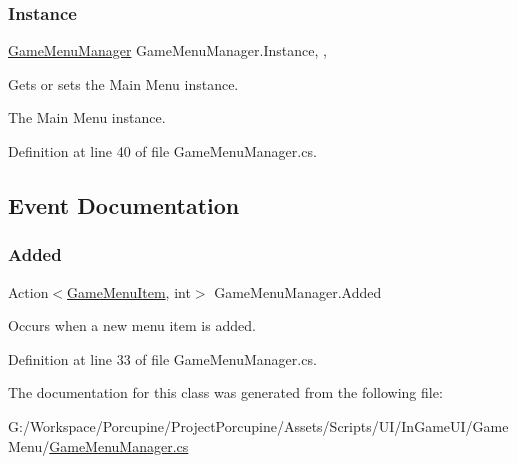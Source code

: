 \subsubsection{\texorpdfstring{Instance}{Instance}}
{\footnotesize\ttfamily \hyperlink{class_game_menu_manager}{Game\+Menu\+Manager} Game\+Menu\+Manager.\+Instance\hspace{0.3cm}{\ttfamily [static]}, {\ttfamily [get]}, {\ttfamily [set]}}



Gets or sets the Main Menu instance. 

The Main Menu instance.

Definition at line 40 of file Game\+Menu\+Manager.\+cs.



\subsection{Event Documentation}
\mbox{\label{class_game_menu_manager_a5628e819ba6ebe7d3905de7af1843b9f}} 
\subsubsection{\texorpdfstring{Added}{Added}}
{\footnotesize\ttfamily Action$<$\hyperlink{class_game_menu_item}{Game\+Menu\+Item}, int$>$ Game\+Menu\+Manager.\+Added}



Occurs when a new menu item is added. 



Definition at line 33 of file Game\+Menu\+Manager.\+cs.



The documentation for this class was generated from the following file\+:\begin{DoxyCompactItemize}
\item 
G\+:/\+Workspace/\+Porcupine/\+Project\+Porcupine/\+Assets/\+Scripts/\+U\+I/\+In\+Game\+U\+I/\+Game\+Menu/\hyperlink{_game_menu_manager_8cs}{Game\+Menu\+Manager.\+cs}\end{DoxyCompactItemize}
